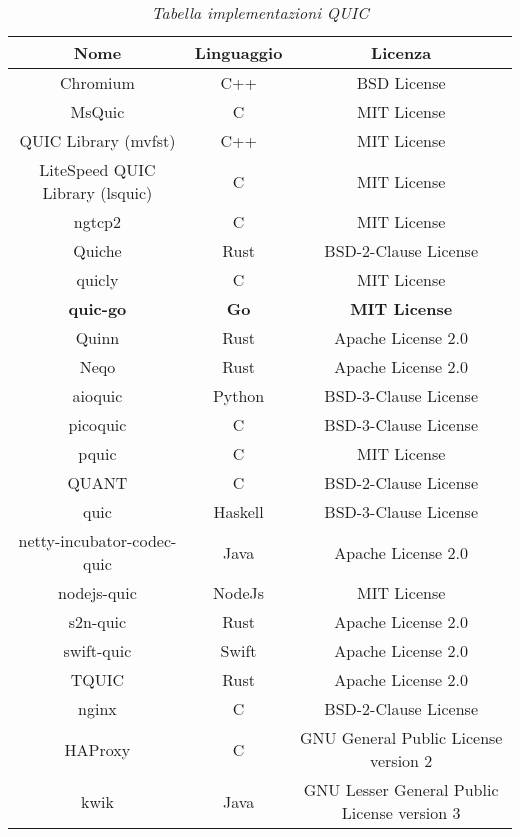 \begin{table}[!h]
    \centering
    \begin{tabular}{|c|c|c|}
        \hline
        \textbf{Nome} & \textbf{Linguaggio} & \textbf{Licenza} \\
        \hline
        Chromium & C++ & BSD License \\
        \hline
        MsQuic & C & MIT License \\
        \hline
        QUIC Library (mvfst) & C++ & MIT License \\
        \hline
        LiteSpeed QUIC Library (lsquic) & C & MIT License \\
        \hline
        ngtcp2 & C & MIT License \\
        \hline
        Quiche & Rust & BSD-2-Clause License \\
        \hline
        quicly & C & MIT License \\
        \hline
        \textbf{quic-go} & \textbf{Go} & \textbf{MIT License} \\
        \hline
        Quinn & Rust & Apache License 2.0 \\
        \hline
        Neqo & Rust & Apache License 2.0 \\
        \hline
        aioquic & Python & BSD-3-Clause License \\
        \hline
        picoquic & C & BSD-3-Clause License \\
        \hline
        pquic & C & MIT License \\
        \hline
        QUANT & C & BSD-2-Clause License \\
        \hline
        quic & Haskell & BSD-3-Clause License \\
        \hline
        netty-incubator-codec-quic & Java & Apache License 2.0 \\
        \hline
        nodejs-quic & NodeJs & MIT License \\
        \hline
        s2n-quic & Rust & Apache License 2.0 \\
        \hline
        swift-quic & Swift & Apache License 2.0 \\
        \hline
        TQUIC & Rust & Apache License 2.0 \\
        \hline
        nginx & C & BSD-2-Clause License \\
        \hline
        HAProxy & C & GNU General Public License version 2 \\
        \hline
        kwik & Java & GNU Lesser General Public License version 3 \\
        \hline
    \end{tabular}
    \caption{\emph{Tabella implementazioni QUIC}}
    \label{table-implementazioni-quic}
\end{table}

